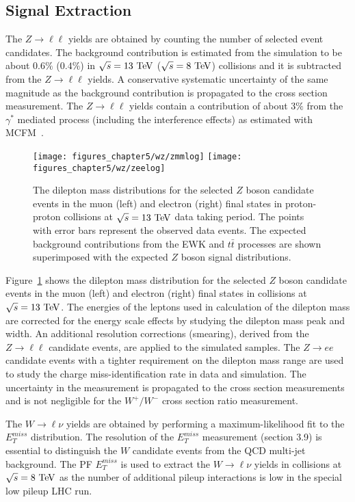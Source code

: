 \subsection{Signal Extraction}

The $Z\rightarrow \ell\ell$ yields are obtained by counting the number of selected event candidates. The background contribution is estimated from the simulation to be about $0.6\%$ ($0.4\%$) in $\sqrt{s}=13~\mathrm{Te\kern -0.1em V}$ ($\sqrt{s}=8~\mathrm{Te\kern -0.1em V}$) collisions and it is subtracted from the $Z\rightarrow \ell\ell$ yields. A conservative systematic uncertainty of the same magnitude as the background contribution is propagated to the cross section measurement. The $Z\rightarrow \ell\ell$ yields contain a contribution of about $3\%$ from the $\gamma^{*}$ mediated process (including the interference effects) as estimated with MCFM~\cite{Campbell:2010ff}. 
\begin{figure}[htbp]
\centering
\texttt{[image: figures\_chapter5/wz/zmmlog]}
\texttt{[image: figures\_chapter5/wz/zeelog]}
\caption{The dilepton mass distributions for the selected $Z$ boson candidate events in the muon (left) and electron (right) final states in proton-proton collisions at $\sqrt{s}=13~\mathrm{Te\kern -0.1em V}$ data taking period. The points with error bars represent the observed data events. The expected background contributions from the EWK and $t\bar{t}$ processes are shown superimposed with the expected $Z$ boson signal distributions. 
\label{fig:z13}}
\end{figure}
Figure~\ref{fig:z13} shows the dilepton mass distribution for the selected $Z$ boson candidate events in the muon (left) and electron (right) final states in collisions at $\sqrt{s}=13~\mathrm{Te\kern -0.1em V}$. The energies of the leptons used in calculation of the dilepton mass are corrected for the energy scale effects by studying the dilepton mass peak and width. An additional resolution corrections (smearing), derived from the $Z \rightarrow \ell\ell$ candidate events, are applied to the simulated samples. The  $Z \rightarrow ee$ candidate events with a tighter requirement on the dilepton mass range are used to study the charge miss-identification rate in data and simulation. The uncertainty in the measurement is propagated to the cross section measurements and is not negligible for the $W^+/W^-$ cross section ratio measurement.      
 
 The $W \rightarrow \ell \nu$ yields are obtained by performing a maximum-likelihood fit to the $E_{T}^{miss}$ distribution. The resolution of the $E_{T}^{miss}$ measurement (section 3.9) is essential to distinguish the $W$ candidate events from the QCD multi-jet background. The PF $E_{T}^{miss}$ is used to extract the $W \rightarrow \ell \nu$ yields in collisions at $\sqrt{s}=8~\mathrm{Te\kern -0.1em V}$ as the number of additional pileup interactions is low in the special low pileup LHC run. 
 
